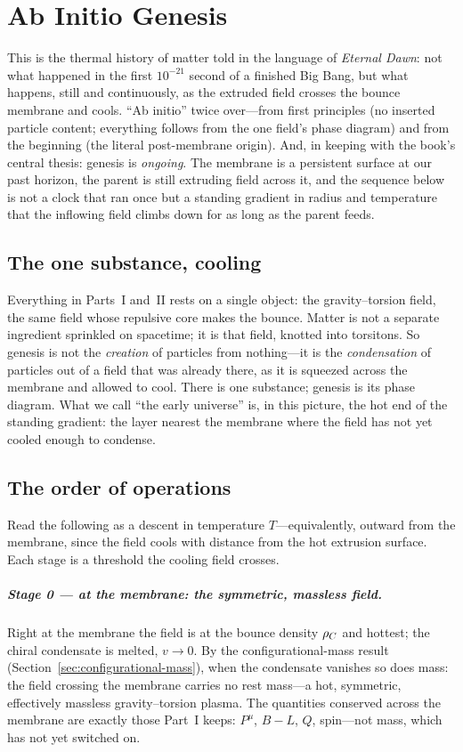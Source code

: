 \chapter{Ab Initio Genesis}
\label{chap:genesis}

This is the thermal history of matter told in the language of \emph{Eternal Dawn}: not what
happened in the first $10^{-21}$ second of a finished Big Bang, but what happens, still and
continuously, as the extruded field crosses the bounce membrane and cools. ``Ab initio''
twice over---from first principles (no inserted particle content; everything follows from the
one field's phase diagram) and from the beginning (the literal post-membrane origin). And, in
keeping with the book's central thesis: genesis is \emph{ongoing}. The membrane is a
persistent surface at our past horizon, the parent is still extruding field across it, and the
sequence below is not a clock that ran once but a standing gradient in radius and temperature
that the inflowing field climbs down for as long as the parent feeds.

\section{The one substance, cooling}

Everything in Parts~I and~II rests on a single object: the gravity--torsion field, the same
field whose repulsive core makes the bounce. Matter is not a separate ingredient sprinkled on
spacetime; it is that field, knotted into torsitons. So genesis is not the \emph{creation} of
particles from nothing---it is the \emph{condensation} of particles out of a field that was
already there, as it is squeezed across the membrane and allowed to cool. There is one
substance; genesis is its phase diagram. What we call ``the early universe'' is, in this
picture, the hot end of the standing gradient: the layer nearest the membrane where the field
has not yet cooled enough to condense.

\section{The order of operations}

Read the following as a descent in temperature $T$---equivalently, outward from the membrane,
since the field cools with distance from the hot extrusion surface. Each stage is a threshold
the cooling field crosses.

\paragraph{Stage 0 --- at the membrane: the symmetric, massless field.}
Right at the membrane the field is at the bounce density $\rho_{C}$ and hottest; the chiral
condensate is melted, $v\to0$. By the configurational-mass result
(Section~\ref{sec:configurational-mass}), when the condensate vanishes so does mass: the
field crossing the membrane carries no rest mass---a hot, symmetric, effectively massless
gravity--torsion plasma. The quantities conserved across the membrane are exactly those
Part~I keeps: $P^\mu$, $B\!-\!L$, $Q$, spin---not mass, which has not yet switched on.

